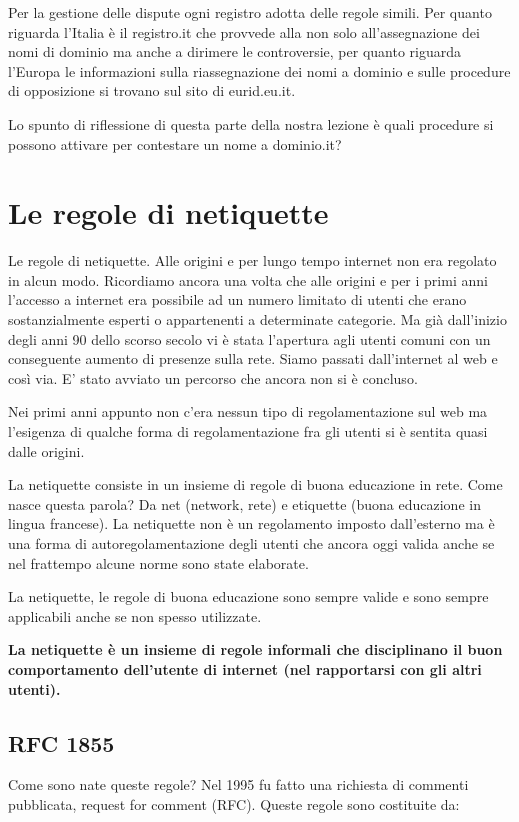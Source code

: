 Per la gestione delle dispute ogni registro adotta delle regole simili. Per quanto riguarda l'Italia è il registro.it che provvede alla non solo all'assegnazione dei nomi di dominio ma anche a dirimere le controversie, per quanto riguarda l'Europa le informazioni sulla riassegnazione dei nomi a dominio e sulle procedure di opposizione si trovano sul sito di eurid.eu.it.

Lo spunto di riflessione di questa parte della nostra lezione è quali procedure si possono attivare per contestare un nome a dominio.it?

\section{Le regole di netiquette}

Le regole di netiquette. Alle origini e per lungo tempo internet non era regolato in alcun modo. Ricordiamo ancora una volta che alle origini e per i primi anni l'accesso a internet era possibile ad un numero limitato di utenti che erano sostanzialmente esperti o appartenenti a determinate categorie. Ma già dall'inizio degli anni 90 dello scorso secolo vi è stata l'apertura agli utenti comuni con un conseguente aumento di presenze sulla rete. Siamo passati dall'internet al web e così via. E' stato avviato un percorso che ancora non si è concluso.

Nei primi anni appunto non c'era nessun tipo di regolamentazione sul web ma l'esigenza di qualche forma di regolamentazione fra gli utenti si è sentita quasi dalle origini.

La netiquette consiste in un insieme di regole di buona educazione in rete. Come nasce questa parola? Da net (network, rete) e etiquette (buona educazione in lingua francese). La netiquette non è un regolamento imposto dall'esterno ma è una forma di autoregolamentazione degli utenti che ancora oggi valida anche se nel frattempo alcune norme sono state elaborate.

La netiquette, le regole di buona educazione sono sempre valide e sono sempre applicabili anche se non spesso utilizzate.

\textbf{La netiquette è un insieme di regole informali che disciplinano il buon comportamento dell'utente di internet (nel rapportarsi con gli altri utenti).}

\subsection{RFC 1855}
Come sono nate queste regole? Nel 1995 fu fatto una richiesta di commenti pubblicata, request for comment (RFC). Queste regole sono costituite da:

